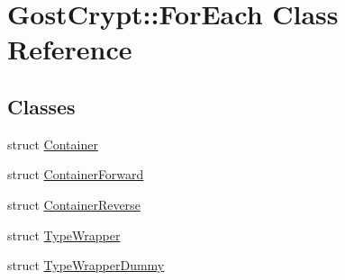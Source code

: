 \hypertarget{class_gost_crypt_1_1_for_each}{}\section{Gost\+Crypt\+:\+:For\+Each Class Reference}
\label{class_gost_crypt_1_1_for_each}
\subsection*{Classes}
\begin{DoxyCompactItemize}
\item 
struct \hyperlink{struct_gost_crypt_1_1_for_each_1_1_container}{Container}
\item 
struct \hyperlink{struct_gost_crypt_1_1_for_each_1_1_container_forward}{Container\+Forward}
\item 
struct \hyperlink{struct_gost_crypt_1_1_for_each_1_1_container_reverse}{Container\+Reverse}
\item 
struct \hyperlink{struct_gost_crypt_1_1_for_each_1_1_type_wrapper}{Type\+Wrapper}
\item 
struct \hyperlink{struct_gost_crypt_1_1_for_each_1_1_type_wrapper_dummy}{Type\+Wrapper\+Dummy}
\end{DoxyCompactItemize}
